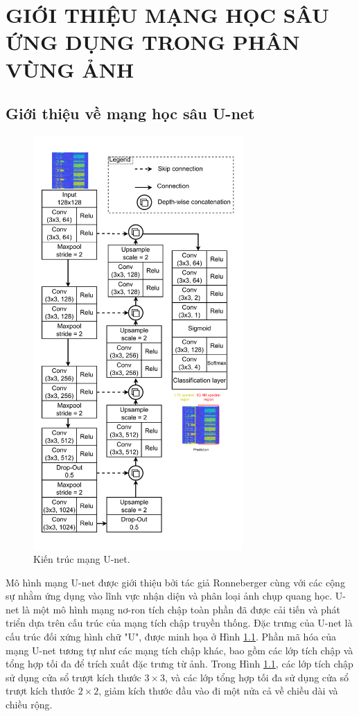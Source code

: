 \chapter{GIỚI THIỆU MẠNG HỌC SÂU ỨNG DỤNG TRONG PHÂN VÙNG ẢNH}
\section{Giới thiệu về mạng học sâu U-net}

\begin{figure}[h]
	\centering
	\includegraphics[width=80mm]{fig/Design-Unet.pdf}
        \captionsetup{justification=centering}
	\caption{Kiến trúc mạng U-net.}
	\label{fig_U-net}
\end{figure}

Mô hình mạng U-net được giới thiệu bởi tác giả Ronneberger \cite{aghalari2021brain} cùng với các cộng sự nhằm ứng dụng vào lĩnh vực nhận diện và phân loại ảnh chụp quang học. U-net là một mô hình mạng nơ-ron tích chập toàn phần đã được cải tiến và phát triển dựa trên cấu trúc của mạng tích chập truyền thống. Đặc trưng của U-net là cấu trúc đối xứng hình chữ "U", được minh họa ở Hình \ref{fig_U-net}. Phần mã hóa của mạng U-net tương tự như các mạng tích chập khác, bao gồm các lớp tích chập và tổng hợp tối đa để trích xuất đặc trưng từ ảnh. Trong Hình \ref{fig_U-net}, các lớp tích chập sử dụng cửa sổ trượt kích thước $3\times3$, và các lớp tổng hợp tối đa sử dụng cửa sổ trượt kích thước $2\times2$, giảm kích thước đầu vào đi một nửa cả về chiều dài và chiều rộng.

